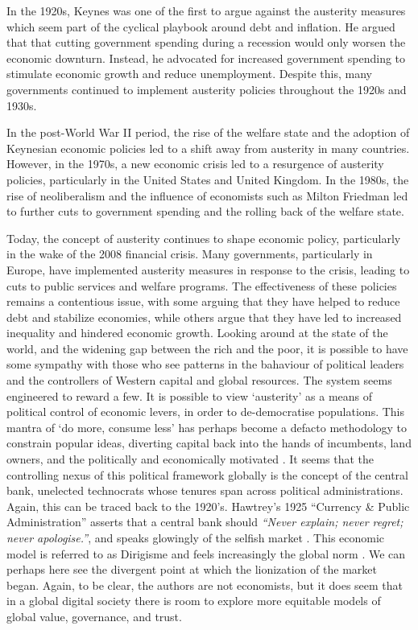 In the 1920s, Keynes was one of the first to argue against the austerity measures which seem part of the cyclical playbook around debt and inflation. He argued that that cutting government spending during a recession would only worsen the economic downturn. Instead, he advocated for increased government spending to stimulate economic growth and reduce unemployment. Despite this, many governments continued to implement austerity policies throughout the 1920s and 1930s.\par
In the post-World War II period, the rise of the welfare state and the adoption of Keynesian economic policies led to a shift away from austerity in many countries. However, in the 1970s, a new economic crisis led to a resurgence of austerity policies, particularly in the United States and United Kingdom. In the 1980s, the rise of neoliberalism and the influence of economists such as Milton Friedman led to further cuts to government spending and the rolling back of the welfare state.\par 
Today, the concept of austerity continues to shape economic policy, particularly in the wake of the 2008 financial crisis. Many governments, particularly in Europe, have implemented austerity measures in response to the crisis, leading to cuts to public services and welfare programs. The effectiveness of these policies remains a contentious issue, with some arguing that they have helped to reduce debt and stabilize economies, while others argue that they have led to increased inequality and hindered economic growth. Looking around at the state of the world, and the widening gap between the rich and the poor, it is possible to have some sympathy with those who see patterns in the bahaviour of political leaders and the controllers of Western capital and global resources. The system seems engineered to reward a few. It is possible to view `austerity' as a means of political control of economic levers, in order to de-democratise populations. This mantra of `do more, consume less' has perhaps become a defacto methodology to constrain popular ideas, diverting capital back into the hands of incumbents, land owners, and the politically and economically motivated \cite{mattei2022capital}. It seems that the controlling nexus of this political framework globally is the concept of the central bank, unelected technocrats whose tenures span across political administrations. Again, this can be traced back to the 1920's. Hawtrey’s 1925 ``Currency \& Public Administration'' asserts that a central bank should \textit{``Never explain; never regret; never apologise.''}, and speaks glowingly of the selfish market \cite{hawtrey1925currency}. This economic model is referred to as Dirigisme and feels increasingly the global norm \cite{balassa2013theory}.  We can perhaps here see the divergent point at which the lionization of the market began. Again, to be clear, the authors are not economists, but it does seem that in a global digital society there is room to explore more equitable models of global value, governance, and trust.\par
